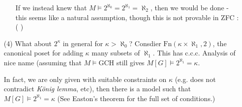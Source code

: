 \documentclass[12pt,a4paper]{article}
\begin{document}
\begin{itemize}
\begin{itemize}
\quad If we instead knew that $M\models 2^{\aleph_0} = 2^{\aleph_1} = \aleph_2$, then we would be done - this seems like a natural assumption, though this is not provable in ZFC :( ) 
\end{itemize}

\item[(4)] What about $2^{\kappa}$ in general for $\kappa > \aleph_0$? Consdier $\text{Fn}(\kappa \times \aleph_1, 2)$, the canonical poset for adding $\kappa$ many subsets of $\aleph_1$. This has c.c.c. Analysis of nice name (assuming that $M\models \text{GCH}$ still gives $M[G] \models 2^{\aleph_1} = \kappa$.
\s

In fact, we are only given with suitable constraints on $\kappa$ (e.g. does not contradict \emph{K\"onig lemma}, etc), then there is a model such that $M[G] \models 2^{\aleph_1} = \kappa$ (See Easton's theorem for the full set of conditions.)
\end{itemize}
\end{document}
